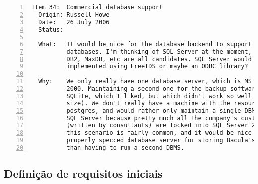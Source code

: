\begin{Verbatim}[frame=single, fontsize=\tiny, numbers=left, label=\url{http://www.bacula.org/en/?page=projects}]
Item 34:  Commercial database support
  Origin: Russell Howe 
  Date:   26 July 2006
  Status:

  What:   It would be nice for the database backend to support more 
          databases. I'm thinking of SQL Server at the moment, but I guess Oracle, 
          DB2, MaxDB, etc are all candidates. SQL Server would presumably be 
          implemented using FreeTDS or maybe an ODBC library?

  Why:    We only really have one database server, which is MS SQL Server 
          2000. Maintaining a second one for the backup software (we grew out of 
          SQLite, which I liked, but which didn't work so well with our database 
          size). We don't really have a machine with the resources to run 
          postgres, and would rather only maintain a single DBMS. We're stuck with 
          SQL Server because pretty much all the company's custom applications 
          (written by consultants) are locked into SQL Server 2000. I can imagine 
          this scenario is fairly common, and it would be nice to use the existing 
          properly specced database server for storing Bacula's catalog, rather 
          than having to run a second DBMS.                                          
\end{Verbatim}

\subsection{Definição de requisitos iniciais}\label{sec:anexoa:baculalibdbi}

